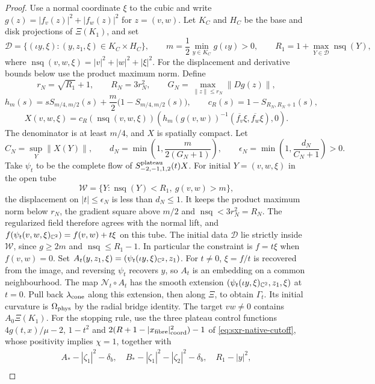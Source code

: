 \begin{proof}
Use a normal coordinate $\xi$ to the cubic and write
$g(z)=|f_v(z)|^2+|f_w(z)|^2$ for $z=(v,w)$.
Let $K_C$ and $H_C$ be the base and disk projections of $\Xi(K_1)$, and set
\[
 \mathcal D=\{(\iota y,\xi):(y,z_1,\xi)\in K_C\times H_C\},\qquad
 m=\frac12\min_{y\in K_C}g(\iota y)>0,\qquad
 R_1=1+\max_{Y\in\mathcal D}\operatorname{nsq}(Y),
\]
where $\operatorname{nsq}(v,w,\xi)=|v|^2+|w|^2+|\xi|^2$.
For the displacement and derivative bounds below use the product maximum norm. Define
\[
 r_N=\sqrt{R_1}+1,\qquad R_N=3r_N^2,\qquad
 G_N=\max_{\|z\|\le r_N}\|Dg(z)\|,
\]
\[
 h_m(s)=sS_{m/4,m/2}(s)+\frac m2\bigl(1-S_{m/4,m/2}(s)\bigr),\qquad
 c_R(s)=1-S_{R_N,R_N+1}(s),
\]
\[
 X(v,w,\xi)=c_R(\operatorname{nsq}(v,w,\xi))
 \left(h_m(g(v,w))^{-1}(\overline{f_v}\xi,\overline{f_w}\xi),0\right).
\]
The denominator is at least $m/4$, and $X$ is spatially compact. Let
\[
 C_N=\sup_Y\|X(Y)\|,\qquad
 d_N=\min\left(1,\frac{m}{2(G_N+1)}\right),\qquad
 \epsilon_N=\min\left(1,\frac{d_N}{C_N+1}\right)>0.
\]
Take $\psi_t$ to be the complete flow of
$S^{\rm plateau}_{-2,-1,1,2}(t)X$.
For initial $Y=(v,w,\xi)$ in the open tube
\[
 \mathcal W=\{Y:\operatorname{nsq}(Y)<R_1,\ g(v,w)>m\},
\]
the displacement on $|t|\le\epsilon_N$ is less than $d_N\le1$.
It keeps the product maximum norm below $r_N$, the gradient square above $m/2$ and
$\operatorname{nsq}<3r_N^2=R_N$.
The regularized field therefore agrees with the normal lift, and
$f(\psi_t(v,w,\xi)_{\mathbb{C}^2})=f(v,w)+t\xi$ on this tube.
The initial data $\mathcal D$ lie strictly inside $\mathcal W$, since $g\ge2m$ and
$\operatorname{nsq}\le R_1-1$. In particular the constraint is $f=t\xi$ when $f(v,w)=0$.
Set $A_t(y,z_1,\xi)=(\psi_t(\iota y,\xi)_{\mathbb{C}^2},z_1)$.
For $t\ne0$, $\xi=f/t$ is recovered from the image, and reversing $\psi_t$
recovers $y$, so $A_t$ is an embedding on a common neighbourhood.
The map $\mathcal N_t\circ A_t$ has the smooth extension
$(\psi_t(\iota y,\xi)_{\mathbb{C}^2},z_1,\xi)$ at $t=0$.
Pull back $\lambda_{\rm cone}$ along this extension, then along $\Xi$, to obtain
$\Gamma_t$. Its initial curvature is $\Omega_{\rm phys}$ by the radial bridge
identity. The target $vw\ne0$ contains $A_0\Xi(K_1)$.
For the stopping rule, use the three plateau control functions
$4g(t,x)/\mu-2$, $1-t^2$ and $2(R+1-|x_{\rm fibre}|_{\rm coord}^2)-1$ of \eqref{eq:sxr-native-cutoff}, whose positivity
implies $\chi=1$, together with
\[
 \begin{gathered}
 A_*-|\zeta_1|^2-\delta_b,\quad
 B_*-|\zeta_1|^2-|\zeta_2|^2-\delta_b,\quad
 R_1-|y|^2,\\

\end{gathered}\]
\end{proof}
